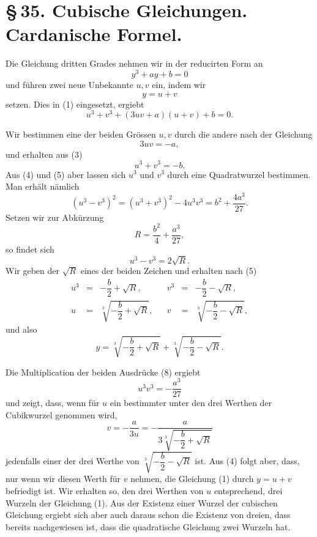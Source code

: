 \documentclass[11pt]{article}
\begin{document}
\section*{\S\,35. Cubische Gleichungen. Cardanische Formel.}

Die Gleichung dritten Grades nehmen wir in der reducirten Form an
\begin{equation}
y^3+ay+b=0
\tag{1}
\end{equation}
und führen zwei neue Unbekannte $u,v$ ein, indem wir
\begin{equation}
y=u+v
\tag{2}
\end{equation}
setzen. Dies in (1) eingesetzt, ergiebt
\begin{equation}
u^3+v^3+(3uv+a)(u+v)+b=0.
\tag{3}
\end{equation}

Wir bestimmen eine der beiden Grössen $u,v$ durch die andere nach der Gleichung
\begin{equation}
3uv=-a,
\tag{4}
\end{equation}
und erhalten aus (3)
\begin{equation}
u^3+v^3=-b.
\tag{5}
\end{equation}
Aus (4) und (5) aber lassen sich $u^3$ und $v^3$ durch eine Quadratwurzel bestimmen. Man erhält nämlich
\begin{equation}
(u^3-v^3)^2=(u^3+v^3)^2-4u^3v^3
=b^2+\frac{4a^3}{27}.
\tag{6}
\end{equation}
Setzen wir zur Abkürzung
\begin{equation}
R=\frac{b^2}{4}+\frac{a^3}{27},
\tag{7}
\end{equation}
so findet sich
\[
 u^3-v^3=2\sqrt R.
\]
Wir geben der $\sqrt R$ eines der beiden Zeichen und erhalten nach (5)
\begin{equation}
\begin{array}{rclcrcl}
u^3&=&-\dfrac b2+\sqrt R,&& v^3&=&-\dfrac b2-\sqrt R,\\[0.75em]
u&=&\sqrt[3]{-\dfrac b2+\sqrt R},&& v&=&\sqrt[3]{-\dfrac b2-\sqrt R},
\end{array}
\tag{8}
\end{equation}
und also
\begin{equation}
y=\sqrt[3]{-\frac b2+\sqrt R}+\sqrt[3]{-\frac b2-\sqrt R}.
\tag{9}
\end{equation}

Die Multiplication der beiden Ausdrücke (8) ergiebt
\[
 u^3v^3=-\frac{a^3}{27}
\]
und zeigt, dass, wenn für $u$ ein bestimmter unter den drei Werthen der Cubikwurzel genommen wird,
\begin{equation}
v=-\frac{a}{3u}=-\frac{a}{3\sqrt[3]{-\dfrac b2+\sqrt R}}
\tag{10}
\end{equation}
jedenfalls einer der drei Werthe von $\sqrt[3]{-\dfrac b2-\sqrt R}$ ist. Aus (4) folgt aber, dass, nur wenn wir diesen Werth für $v$ nehmen, die Gleichung (1) durch $y=u+v$ befriedigt ist. Wir erhalten so, den drei Werthen von $u$ entsprechend, drei Wurzeln der Gleichung (1). Aus der Existenz einer Wurzel der cubischen Gleichung ergiebt sich aber auch daraus schon die Existenz von dreien, dass bereits nachgewiesen ist, dass die quadratische Gleichung zwei Wurzeln hat.
\end{document}
